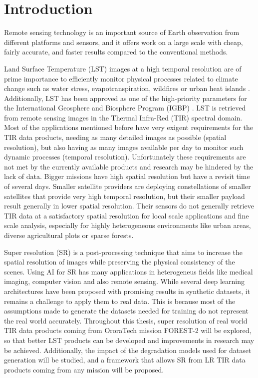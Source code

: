 \section{Introduction} \label{sec:intro}


Remote sensing technology is an important source of Earth observation from different platforms
and sensors, and it offers work on a large scale with cheap, fairly accurate, and faster results compared to the conventional methods.

Land Surface Temperature (LST) images at a high temporal resolution are of prime importance to efficiently monitor physical processes related to climate change such as water stress, evapotranspiration, wildfires or urban heat islands \cite{lst2005}.
Additionally, LST has been approved as one of the high-priority parameters for the International Geosphere and Biosphere Program (IGBP) \cite{townshend94}.
LST is retrieved from remote sensing images in the Thermal Infra-Red (TIR) spectral domain.  
Most of the applications mentioned before have very exigent requirements for the TIR data products, needing as many detailed images as possible (spatial resolution), but also having as many images available per day to monitor such dynamic processes (temporal resolution).
Unfortunately these requirements are not met by the currently available products and research may be hindered by the lack of data. 
Bigger missions have high spatial resolution but have a revisit time of several days.
Smaller satellite providers are deploying constellations of smaller satellites that provide very high temporal resolution, but their smaller payload result generally in lower spatial resolution.
Their sensors do not generally retrieve TIR data at a satisfactory spatial resolution for local scale applications and fine scale analysis, especially for highly heterogeneous environments like urban areas, diverse agricultural plots or sparse forests.

Super resolution (SR) is a post-processing technique that aims to increase the spatial resolution of images while preserving the physical consistency of the scenes.
Using AI for SR has many applications in heterogeneus fields like medical imaging, computer vision and also remote sensing. 
While several deep learning architectures have been proposed with promising results in synthetic datasets, it remains a challenge to apply them to real data.
This is because most of the assumptions made to generate the datasets needed for training do not represent the real world accurately.
Throughout this thesis, super resolution of real world TIR data products coming from OroraTech mission FOREST-2 will be explored, so that better LST products can be developed and improvements in research may be achieved.
Additionally, the impact of the degradation models used for dataset generation will be studied, and a framework that allows SR from LR TIR data products coming from any mission will be proposed.
 
